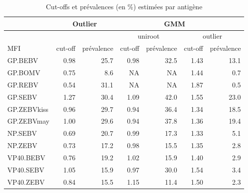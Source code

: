 \begin{table}[H]

\caption{Cut-offs et prévalences (en \%) estimées par antigène}
\centering
\begin{tabular}{|l|rr|rrrr|}
\hline
& \multicolumn{2}{c|}{Outlier} & & \multicolumn{2}{c}{GMM} & \\ \hline
 & & & \multicolumn{2}{c|}{uniroot} & \multicolumn{2}{c|}{outlier} \\ \hline
MFI & cut-off & prévalence & cut-off & \multicolumn{1}{r|}{prévalence} & cut-off  & prévalence \\ \hline
GP.BEBV     & 0.98        & 25.7           & 0.98    & \multicolumn{1}{r|}{32.5}       & 1.43     & 13.1       \\ \hline
GP.BOMV     & 0.75        & 8.6            & NA      & \multicolumn{1}{r|}{NA}         & 1.44     & 0.7        \\ \hline
GP.REBV     & 0.54        & 31.1           & NA      & \multicolumn{1}{r|}{NA}         & 1.87    & 0.5        \\ \hline
GP.SEBV     & 1.27        & 30.4           & 1.09    & \multicolumn{1}{r|}{42.0}       & 1.55     & 23.0       \\ \hline
GP.ZEBVkiss & 0.96        & 29.7           & 0.94    & \multicolumn{1}{r|}{36.4}       & 1.34     & 18.5       \\ \hline
GP.ZEBVmay  & 1.00        & 29.6           & 0.94    & \multicolumn{1}{r|}{37.8}       & 1.36     & 19.4       \\ \hline
NP.SEBV     & 0.69        & 20.7           & 0.99    & \multicolumn{1}{r|}{17.3}       & 1.33     & 5.1        \\ \hline
NP.ZEBV     & 0.73        & 17.2           & 0.98    & \multicolumn{1}{r|}{15.5}       & 1.35     & 2.8        \\ \hline
VP40.BEBV   & 0.76        & 19.2           & 1.02    & \multicolumn{1}{r|}{15.9}       & 1.40     & 2.9        \\ \hline
VP40.SEBV   & 1.05        & 15.9           & 0.97    & \multicolumn{1}{r|}{30.0}       & 1.54     & 3.4        \\ \hline
VP40.ZEBV   & 0.84        & 15.5           & 1.15    & \multicolumn{1}{r|}{11.4}       & 1.50     & 2.3        \\ \hline
\end{tabular}

\end{table}
